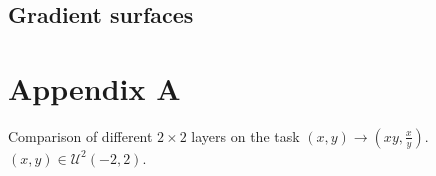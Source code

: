 \documentclass[9pt]{article}
\begin{document}
% 
% 


\subsection{Gradient surfaces}%
\label{sub:gradient_surfaces}
%   

\appendix
\section*{Appendix A}%
\label{sec:appendix_a}

\begin{table}[h]
  \centering
  \caption{Comparison of different $2\times2$ layers on the task
  $(x,y)\rightarrow(xy,\frac{x}{y})$.  $(x,y) \in \mathcal U^2(-2,2)$.}
  \label{tab:compare_npu_npu_nalu}
  
\end{table}





\end{document}
